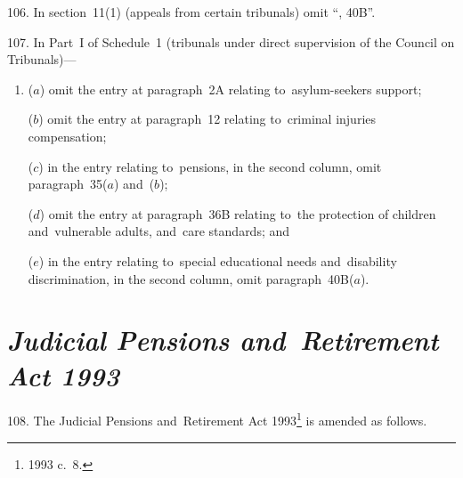 \documentclass[12pt,a4paper]{article}
\begin{document}
\medskip

106.  In section~11(1) (appeals from certain tribunals) omit “, 40B”.

\medskip

107.  In Part~I of Schedule~1 (tribunals under direct supervision of the Council on Tribunals)—
\begin{enumerate}\item[]
($a$) omit the entry at paragraph~2A relating to~asylum-seekers support;

($b$) omit the entry at paragraph~12 relating to~criminal injuries compensation;

($c$) in the entry relating to~pensions, in the second column, omit paragraph~35($a$)  and~($b$);

($d$) omit the entry at paragraph~36B relating to~the protection of children and~vulnerable adults, and~care standards; and

($e$) in the entry relating to~special educational needs and~disability discrimination, in the second column, omit paragraph~40B($a$).
\end{enumerate}

\section*{\itshape Judicial Pensions and~Retirement Act 1993}

108.  The Judicial Pensions and~Retirement Act 1993\footnote{1993 c.~8.} is amended as follows.

\medskip
\end{document}
